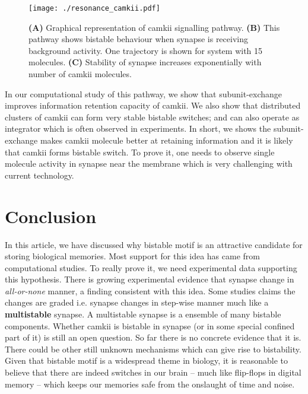 \documentclass[]{resonance}
\begin{document}
\begin{figure}[b!]
    \caption{ \textbf{(A)} Graphical representation of \gls{camkii} signalling
        pathway. \textbf{(B)} This pathway shows bistable behaviour when synapse
        is receiving background activity. One trajectory is shown for system with 
        15 molecules. \textbf{(C)} Stability of synapse increases exponentially
        with number of \gls{camkii} molecules.
    }\label{fig:camkii_summary}
    \centering
    \texttt{[image: ./resonance\_camkii.pdf]}
\end{figure}

In our computational study of this pathway, we show that subunit-exchange
improves information retention capacity of \gls{camkii}. We also show that
distributed clusters of \gls{camkii} can form very stable bistable switches; and
can also operate as integrator which is often observed in experiments. In short,
we shows the subunit-exchange makes \gls{camkii} molecule better at retaining
information and it is likely that \gls{camkii} forms bistable switch. To prove
it, one needs to observe single molecule activity in synapse near the membrane
which is very challenging with current technology.

\section{Conclusion}

In this article, we have discussed why bistable motif is an attractive candidate
for storing biological memories. Most support for this idea has came from
computational studies. To really prove it, we need experimental data supporting
this hypothesis. There is growing experimental evidence that synapse change in
\textit{all-or-none} manner, a finding consistent with this idea. Some studies
claims the changes are graded i.e. synapse changes in step-wise manner much like
a \textbf{multistable} synapse. A multistable synapse is a ensemble of many
bistable components. Whether \gls{camkii} is bistable in synapse (or in some
special confined part of it) is still an open question. So far there is no
concrete evidence that it is. There could be other still unknown mechanisms which can
give rise to bistability. Given that bistable motif is a widespread theme in
biology, it is reasonable to believe that there are indeed switches in our brain
-- much like flip-flops in digital memory -- which keeps our memories safe from
the onslaught of time and noise.
\end{document}
